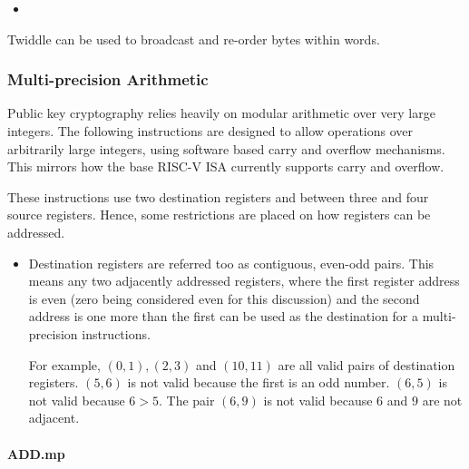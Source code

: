 \begin{itemize}
\item {}
\end{itemize}

Twiddle can be used to broadcast and re-order bytes within words.


\subsubsection{Multi-precision Arithmetic}

Public key cryptography relies heavily on modular arithmetic over very
large integers. The following instructions are designed to allow
operations over arbitrarily large integers, using software based carry
and overflow mechanisms. This mirrors how the base RISC-V ISA currently
supports carry and overflow.

These instructions use two destination registers and between three
and four source registers. Hence, some restrictions are placed on how
registers can be addressed.

\begin{itemize}
\item Destination registers are referred too as contiguous, even-odd
pairs. This means any two adjacently addressed registers, where the
first register address is even (zero being considered even for this
discussion) and the second address is one more than the first can be
used as the destination for a multi-precision instructions. 

For example, $(0,1), (2,3)$ and $(10,11)$ are all valid
pairs of destination registers. $(5,6)$ is not valid because the first
is an odd number. $(6,5)$ is not valid because $6 > 5$. The pair $(6,9)$
is not valid because $6$ and $9$ are not adjacent.
\end{itemize}

\paragraph{ADD.mp}

